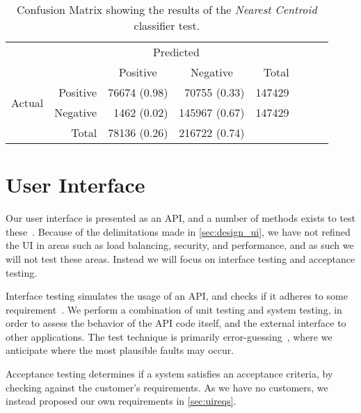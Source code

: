 \begin{table}[tbp]
    \centering
     \begin{tabular}{rrrrrrrr}
      \toprule
      \multicolumn{2}{c}{} & \multicolumn{2}{c}{Predicted} & \\
      \cmidrule{3-4}
      \multicolumn{2}{c}{} & \multicolumn{1}{c}{Positive} & \multicolumn{1}{c}{Negative} & Total \\
      \midrule
      \multirow{2}{*}{Actual} & Positive & \num{76674} (0.98) & \num{70755} (0.33)  & \num{147429} \\
                              & Negative & \num{1462} (0.02)  & \num{145967} (0.67) & \num{147429} \\
                              \cmidrule{1-2}
                              & Total    & \num{78136} (0.26) & \num{216722} (0.74) \\
      \bottomrule
    \end{tabular}
    \caption[Confusion Matrix]{Confusion Matrix showing the results of the \emph{Nearest Centroid} classifier test.}%
    \label{tab:confusionmatrix}
\end{table}

\section{User Interface}
Our user interface is presented as an API, and a number of methods exists to test these~\cite{swebok}. Because of the delimitations made in \cref{sec:design_ui}, we have not refined the UI in areas such as load balancing, security, and performance, and as such we will not test these areas. Instead we will focus on interface testing and acceptance testing.

Interface testing simulates the usage of an API, and checks if it adheres to some requirement~\cite{swebok}. We perform a combination of unit testing and system testing, in order to assess the behavior of the API code itself, and the external interface to other applications. The test technique is primarily error-guessing~\cite{swebok}, where we anticipate where the most plausible faults may occur.

Acceptance testing determines if a system satisfies an acceptance criteria, by checking against the customer's requirements. As we have no customers, we instead proposed our own requirements in \cref{sec:uireqs}.


